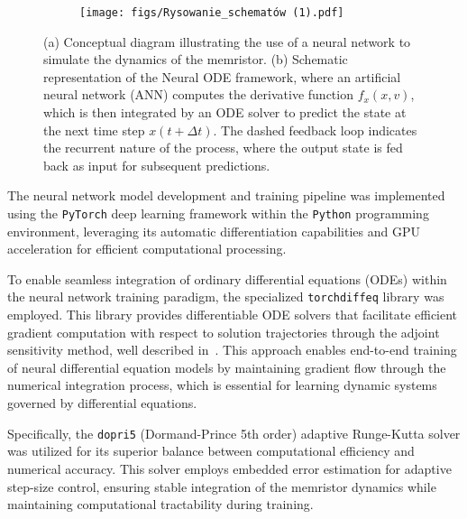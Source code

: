 \documentclass[11pt, oneside]{article}
\begin{document}
\begin{figure}[H]
    \centering
    \begin{subfigure}[b]{0.49\textwidth}
        \texttt{[image: figs/Rysowanie\_schematów (1).pdf]}
        \caption{}
        \label{fig:nn_structure}

    \end{subfigure}
    \begin{subfigure}[b]{0.49\textwidth}
        \resizebox{\linewidth}{!}{%
            
        }
        \caption{}
        \label{fig:nn_process}
    \end{subfigure}
    \hfill
    \caption{(a) Conceptual diagram illustrating the use of a neural network to simulate the dynamics of the memristor. (b) Schematic representation of the Neural ODE framework, where an artificial neural network (ANN) computes the derivative function $f_x(x,v)$, which is then integrated by an ODE solver to predict the state at the next time step $x(t + \Delta t)$. The dashed feedback loop indicates the recurrent nature of the process, where the output state is fed back as input for subsequent predictions.}
\end{figure}



The neural network model development and training pipeline was implemented using the \texttt{PyTorch} deep learning framework within the \texttt{Python} programming environment, leveraging its automatic differentiation capabilities and GPU acceleration for efficient computational processing.


To enable seamless integration of ordinary differential equations (ODEs) within the neural network training paradigm, the specialized \texttt{torchdiffeq} library was employed. This library provides differentiable ODE solvers that facilitate efficient gradient computation with respect to solution trajectories through the adjoint sensitivity method, well described in~\cite{Ricky2018}. This approach enables end-to-end training of neural differential equation models by maintaining gradient flow through the numerical integration process, which is essential for learning dynamic systems governed by differential equations.

Specifically, the \texttt{dopri5} (Dormand-Prince 5th order) adaptive Runge-Kutta solver was utilized for its superior balance between computational efficiency and numerical accuracy. This solver employs embedded error estimation for adaptive step-size control, ensuring stable integration of the memristor dynamics while maintaining computational tractability during training.
\end{document}
